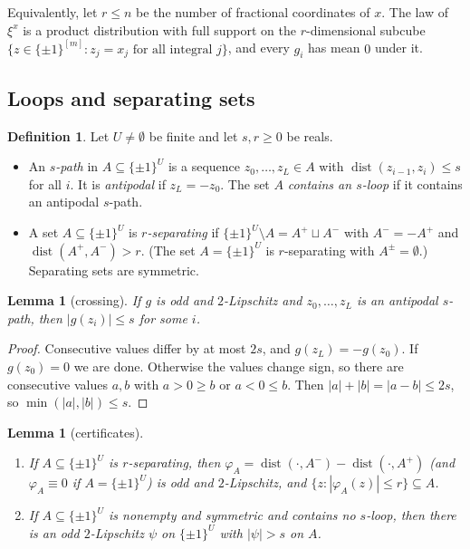 \documentclass[11pt,letterpaper]{article}
\newtheorem{lemma}[theorem]{Lemma}
\theoremstyle{definition}
\newtheorem{definition}[theorem]{Definition}
\newcommand{\cube}[1]{\{\pm1\}^{#1}}
\DeclareMathOperator{\dist}{dist}
\begin{document}
Equivalently, let $r\le n$ be the number of fractional coordinates of $x$. The law of $\xi^x$ is a
product distribution with full support on the $r$-dimensional subcube
$\{z\in\cube{[m]}:z_j=x_j\text{ for all integral }j\}$, and every $g_i$ has mean $0$ under it.

\subsection{Loops and separating sets}

\begin{definition}\label{def:loops}
Let $U\ne\emptyset$ be finite and let $s,r\ge0$ be reals.
\begin{itemize}[itemsep=0pt]
\item An \emph{$s$-path} in $A\subseteq\cube U$ is a sequence $z_0,\dots,z_L\in A$ with
$\dist(z_{i-1},z_i)\le s$ for all $i$. It is \emph{antipodal} if $z_L=-z_0$. The set $A$
\emph{contains an $s$-loop} if it contains an antipodal $s$-path.
\item A set $A\subseteq\cube U$ is \emph{$r$-separating} if $\cube U\setminus A=A^+\sqcup A^-$
with $A^-=-A^+$ and $\dist(A^+,A^-)>r$. (The set $A=\cube U$ is $r$-separating with
$A^\pm=\emptyset$.) Separating sets are symmetric.
\end{itemize}
\end{definition}

\begin{lemma}[crossing]\label{lem:crossing}
If $g$ is odd and $2$-Lipschitz and $z_0,\dots,z_L$ is an antipodal $s$-path, then
$|g(z_i)|\le s$ for some $i$.
\end{lemma}

\begin{proof}
Consecutive values differ by at most $2s$, and $g(z_L)=-g(z_0)$. If $g(z_0)=0$ we are done.
Otherwise the values change sign, so there are consecutive values $a,b$ with $a>0\ge b$ or $a<0\le
b$. Then $|a|+|b|=|a-b|\le2s$, so $\min(|a|,|b|)\le s$.
\end{proof}

\begin{lemma}[certificates]\label{lem:certificate}
\begin{enumerate}[label=(\alph*),itemsep=0pt]
\item If $A\subseteq\cube U$ is $r$-separating, then
$\varphi_A=\dist(\cdot,A^-)-\dist(\cdot,A^+)$ (and $\varphi_A\equiv0$ if $A=\cube U$) is odd and
$2$-Lipschitz, and $\{z:|\varphi_A(z)|\le r\}\subseteq A$.
\item If $A\subseteq\cube U$ is nonempty and symmetric and contains no $s$-loop, then there is
an odd $2$-Lipschitz $\psi$ on $\cube U$ with $|\psi|>s$ on $A$.
\end{enumerate}
\end{lemma}
\end{document}
